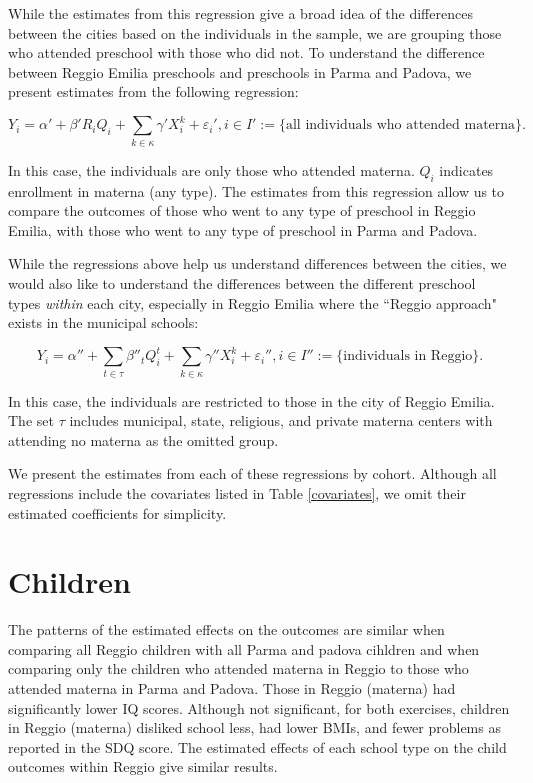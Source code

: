 \documentclass{article}
\begin{document}
While the estimates from this regression give a broad idea of the differences between the cities based on the individuals in the sample, we are grouping those who attended preschool with those who did not. To understand the difference between Reggio Emilia preschools and preschools in Parma and Padova, we present estimates from the following regression:

\begin{equation} \label{compare-preschool}
	Y_{i} = \alpha' + \beta' R_{i} Q_{i} + \sum_{k \in \kappa} \gamma' {X}_{i}^k  + \varepsilon_{i}', i \in I' := \{\text{all individuals who attended materna}\}.
\end{equation}

In this case, the individuals are only those who attended materna. $Q_{i}$ indicates enrollment in materna (any type). The estimates from this regression allow us to compare the outcomes of those who went to any type of preschool in Reggio Emilia, with those who went to any type of preschool in Parma and Padova.

While the regressions above help us understand differences between the cities, we would also like to understand the differences between the different preschool types \textit{within} each city, especially in Reggio Emilia where the ``Reggio approach" exists in the municipal schools:

\begin{equation} \label{within-Reggio}
	Y_{i} = \alpha'' + \sum_{t \in \tau} \beta''_{t} Q^{t}_i + \sum_{k \in \kappa} \gamma'' {X}_{i}^k  + \varepsilon_{i}'', i \in I'' := \{\text{individuals in Reggio}\}.
\end{equation}

In this case, the individuals are restricted to those in the city of Reggio Emilia. The set $\tau$ includes municipal, state, religious, and private materna centers with attending no materna as the omitted group.

We present the estimates from each of these regressions by cohort. Although all regressions include the covariates listed in Table \ref{covariates}, we omit their estimated coefficients for simplicity.


\section{Children}
The patterns of the estimated effects on the outcomes are similar when comparing all Reggio children with all Parma and padova cihldren and when comparing only the children who attended materna in Reggio to those who attended materna in Parma and Padova. Those in Reggio (materna) had significantly lower IQ scores. Although not significant, for both exercises, children in Reggio (materna) disliked school less, had lower BMIs, and fewer problems as reported in the SDQ score. The estimated effects of each school type on the child outcomes within Reggio give similar results.
\end{document}
